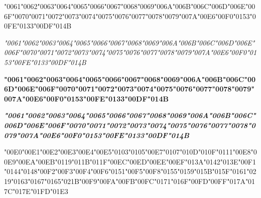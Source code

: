 {
	\textsc{\char"0061\gs \char"0062\gs \char"0063\gs \char"0064\gs \char"0065\gs \char"0066\gs \char"0067\gs \char"0068\gs \char"0069\gs \char"006A\gs \char"006B\gs \char"006C\gs \char"006D\gs \char"006E\gs \char"006F\gs \char"0070\gs \char"0071\gs \char"0072\gs \char"0073\gs \char"0074\gs \char"0075\gs \char"0076\gs \char"0077\gs \char"0078\gs \char"0079\gs \char"007A\gs \char"00E6\gs \char"00F0\gs \char"0153\gs \char"00FE\gs \char"0133\gs \char"00DF\gs \char"014B\gs}
}

{\itshape 
	\textsc{\char"0061\gs \char"0062\gs \char"0063\gs \char"0064\gs \char"0065\gs \char"0066\gs \char"0067\gs \char"0068\gs \char"0069\gs \char"006A\gs \char"006B\gs \char"006C\gs \char"006D\gs \char"006E\gs \char"006F\gs \char"0070\gs \char"0071\gs \char"0072\gs \char"0073\gs \char"0074\gs \char"0075\gs \char"0076\gs \char"0077\gs \char"0078\gs \char"0079\gs \char"007A\gs \char"00E6\gs \char"00F0\gs \char"0153\gs \char"00FE\gs \char"0133\gs \char"00DF\gs \char"014B\gs}
}

{\bfseries 
	\textsc{\char"0061\gs \char"0062\gs \char"0063\gs \char"0064\gs \char"0065\gs \char"0066\gs \char"0067\gs \char"0068\gs \char"0069\gs \char"006A\gs \char"006B\gs \char"006C\gs \char"006D\gs \char"006E\gs \char"006F\gs \char"0070\gs \char"0071\gs \char"0072\gs \char"0073\gs \char"0074\gs \char"0075\gs \char"0076\gs \char"0077\gs \char"0078\gs \char"0079\gs \char"007A\gs \char"00E6\gs \char"00F0\gs \char"0153\gs \char"00FE\gs \char"0133\gs \char"00DF\gs \char"014B\gs}
}

{\itshape\bfseries 
	\textsc{\char"0061\gs \char"0062\gs \char"0063\gs \char"0064\gs \char"0065\gs \char"0066\gs \char"0067\gs \char"0068\gs \char"0069\gs \char"006A\gs \char"006B\gs \char"006C\gs \char"006D\gs \char"006E\gs \char"006F\gs \char"0070\gs \char"0071\gs \char"0072\gs \char"0073\gs \char"0074\gs \char"0075\gs \char"0076\gs \char"0077\gs \char"0078\gs \char"0079\gs \char"007A\gs \char"00E6\gs \char"00F0\gs \char"0153\gs \char"00FE\gs \char"0133\gs \char"00DF\gs \char"014B\gs}
}

\medskip

{
	\textsc{\char"00E0\gs \char"00E1\gs \char"00E2\gs \char"00E3\gs \char"00E4\gs \char"00E5\gs \char"0103\gs \char"0105\gs \char"00E7\gs \char"0107\gs \char"010D\gs \char"010F\gs \char"0111\gs \char"00E8\gs \char"00E9\gs \char"00EA\gs \char"00EB\gs \char"0119\gs \char"011B\gs \char"011F\gs \char"00EC\gs \char"00ED\gs \char"00EE\gs \char"00EF\gs \char"013A\gs \char"0142\gs \char"013E\gs \char"00F1\gs \char"0144\gs \char"0148\gs \char"00F2\gs \char"00F3\gs \char"00F4\gs \char"00F6\gs \char"0151\gs \char"00F5\gs \char"00F8\gs \char"0155\gs \char"0159\gs \char"015B\gs \char"015F\gs \char"0161\gs \char"0219\gs \char"0163\gs \char"0167\gs \char"0165\gs \char"021B\gs \char"00F9\gs \char"00FA\gs \char"00FB\gs \char"00FC\gs \char"0171\gs \char"016F\gs \char"00FD\gs \char"00FF\gs \char"017A\gs \char"017C\gs \char"017E\gs \char"01FD\gs \char"01E3\gs}
}

